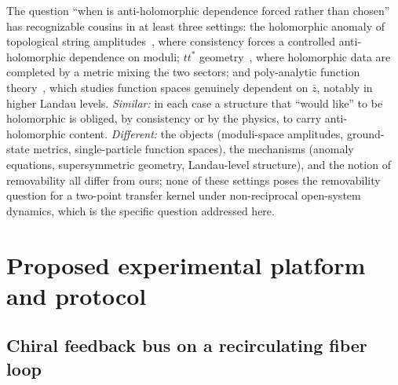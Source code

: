 \documentclass[11pt,a4paper]{article}
\newcommand{\zb}{\bar{z}}
\begin{document}
The question ``when is anti-holomorphic dependence forced rather than chosen''
has recognizable cousins in at least three settings: the holomorphic anomaly of
topological string amplitudes~\cite{BCOV1994}, where consistency forces a
controlled anti-holomorphic dependence on moduli; $tt^*$
geometry~\cite{CecottiVafa1991}, where holomorphic data are completed by a
metric mixing the two sectors; and poly-analytic function
theory~\cite{Vasilevski2000,Abreu2010,AbreuFeichtinger2014}, which studies
function spaces genuinely dependent on $\zb$, notably in higher Landau levels.
\emph{Similar:} in each case a structure that ``would like'' to be holomorphic
is obliged, by consistency or by the physics, to carry anti-holomorphic
content. \emph{Different:} the objects (moduli-space amplitudes, ground-state
metrics, single-particle function spaces), the mechanisms (anomaly equations,
supersymmetric geometry, Landau-level structure), and the notion of
removability all differ from ours; none of these settings poses the
removability question for a two-point transfer kernel under non-reciprocal
open-system dynamics, which is the specific question addressed here.

\section{Proposed experimental platform and protocol}
\label{sec:platform}

\subsection{Chiral feedback bus on a recirculating fiber loop}
\end{document}
